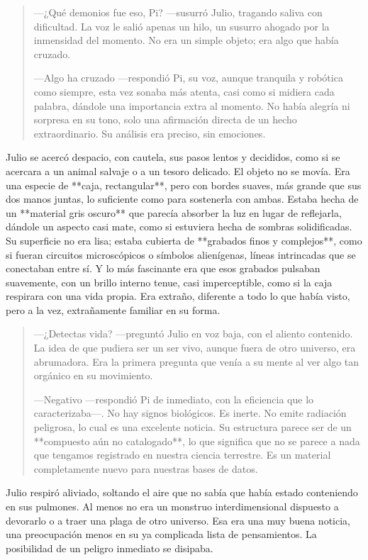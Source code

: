 \documentclass[a4paper,12pt]{book}
\begin{document}
\begin{quote}
    —¿Qué demonios fue eso, Pi? —susurró Julio, tragando saliva con dificultad. La voz le salió apenas un hilo, un susurro ahogado por la inmensidad del momento. No era un simple objeto; era algo que había cruzado.

    —Algo ha cruzado —respondió Pi, su voz, aunque tranquila y robótica como siempre, esta vez sonaba más atenta, casi como si midiera cada palabra, dándole una importancia extra al momento. No había alegría ni sorpresa en su tono, solo una afirmación directa de un hecho extraordinario. Su análisis era preciso, sin emociones.
\end{quote}

Julio se acercó despacio, con cautela, sus pasos lentos y decididos, como si se acercara a un animal salvaje o a un tesoro delicado. El objeto no se movía. Era una especie de **caja, rectangular**, pero con bordes suaves, más grande que sus dos manos juntas, lo suficiente como para sostenerla con ambas. Estaba hecha de un **material gris oscuro** que parecía absorber la luz en lugar de reflejarla, dándole un aspecto casi mate, como si estuviera hecha de sombras solidificadas. Su superficie no era lisa; estaba cubierta de **grabados finos y complejos**, como si fueran circuitos microscópicos o símbolos alienígenas, líneas intrincadas que se conectaban entre sí. Y lo más fascinante era que esos grabados pulsaban suavemente, con un brillo interno tenue, casi imperceptible, como si la caja respirara con una vida propia. Era extraño, diferente a todo lo que había visto, pero a la vez, extrañamente familiar en su forma.

\begin{quote}
    —¿Detectas vida? —preguntó Julio en voz baja, con el aliento contenido. La idea de que pudiera ser un ser vivo, aunque fuera de otro universo, era abrumadora. Era la primera pregunta que venía a su mente al ver algo tan orgánico en su movimiento.

    —Negativo —respondió Pi de inmediato, con la eficiencia que lo caracterizaba—. No hay signos biológicos. Es inerte. No emite radiación peligrosa, lo cual es una excelente noticia. Su estructura parece ser de un **compuesto aún no catalogado**, lo que significa que no se parece a nada que tengamos registrado en nuestra ciencia terrestre. Es un material completamente nuevo para nuestras bases de datos.
\end{quote}

Julio respiró aliviado, soltando el aire que no sabía que había estado conteniendo en sus pulmones. Al menos no era un monstruo interdimensional dispuesto a devorarlo o a traer una plaga de otro universo. Esa era una muy buena noticia, una preocupación menos en su ya complicada lista de pensamientos. La posibilidad de un peligro inmediato se disipaba.
\end{document}
